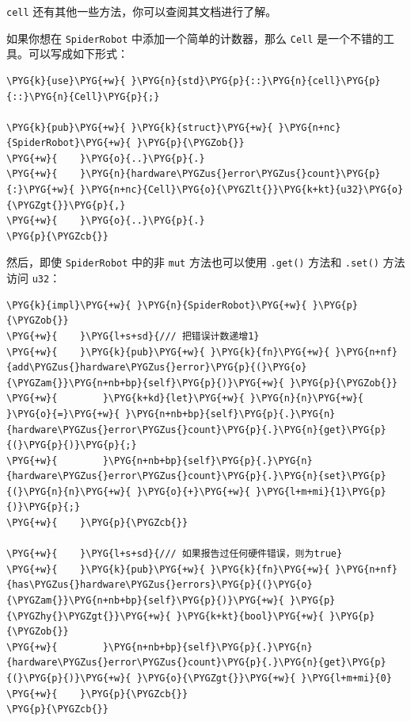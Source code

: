 \texttt{cell} 还有其他一些方法，你可以查阅其文档进行了解。

如果你想在 \texttt{SpiderRobot} 中添加一个简单的计数器，那么 \texttt{Cell} 是一个不错的工具。可以写成如下形式：

\begin{Verbatim}[commandchars=\\\{\},breaklines=true,breakanywhere=true,fontsize=\codefont,xleftmargin=17bp]
\PYG{k}{use}\PYG{+w}{ }\PYG{n}{std}\PYG{p}{::}\PYG{n}{cell}\PYG{p}{::}\PYG{n}{Cell}\PYG{p}{;}

\PYG{k}{pub}\PYG{+w}{ }\PYG{k}{struct}\PYG{+w}{ }\PYG{n+nc}{SpiderRobot}\PYG{+w}{ }\PYG{p}{\PYGZob{}}
\PYG{+w}{    }\PYG{o}{..}\PYG{p}{.}
\PYG{+w}{    }\PYG{n}{hardware\PYGZus{}error\PYGZus{}count}\PYG{p}{:}\PYG{+w}{ }\PYG{n+nc}{Cell}\PYG{o}{\PYGZlt{}}\PYG{k+kt}{u32}\PYG{o}{\PYGZgt{}}\PYG{p}{,}
\PYG{+w}{    }\PYG{o}{..}\PYG{p}{.}
\PYG{p}{\PYGZcb{}}
\end{Verbatim}

然后，即使 \texttt{SpiderRobot} 中的非 \texttt{mut} 方法也可以使用 \texttt{.get()} 方法和 \texttt{.set()} 方法访问 \texttt{u32}：

\begin{Verbatim}[commandchars=\\\{\},breaklines=true,breakanywhere=true,fontsize=\codefont,xleftmargin=17bp]
\PYG{k}{impl}\PYG{+w}{ }\PYG{n}{SpiderRobot}\PYG{+w}{ }\PYG{p}{\PYGZob{}}
\PYG{+w}{    }\PYG{l+s+sd}{/// 把错误计数递增1}
\PYG{+w}{    }\PYG{k}{pub}\PYG{+w}{ }\PYG{k}{fn}\PYG{+w}{ }\PYG{n+nf}{add\PYGZus{}hardware\PYGZus{}error}\PYG{p}{(}\PYG{o}{\PYGZam{}}\PYG{n+nb+bp}{self}\PYG{p}{)}\PYG{+w}{ }\PYG{p}{\PYGZob{}}
\PYG{+w}{        }\PYG{k+kd}{let}\PYG{+w}{ }\PYG{n}{n}\PYG{+w}{ }\PYG{o}{=}\PYG{+w}{ }\PYG{n+nb+bp}{self}\PYG{p}{.}\PYG{n}{hardware\PYGZus{}error\PYGZus{}count}\PYG{p}{.}\PYG{n}{get}\PYG{p}{(}\PYG{p}{)}\PYG{p}{;}
\PYG{+w}{        }\PYG{n+nb+bp}{self}\PYG{p}{.}\PYG{n}{hardware\PYGZus{}error\PYGZus{}count}\PYG{p}{.}\PYG{n}{set}\PYG{p}{(}\PYG{n}{n}\PYG{+w}{ }\PYG{o}{+}\PYG{+w}{ }\PYG{l+m+mi}{1}\PYG{p}{)}\PYG{p}{;}
\PYG{+w}{    }\PYG{p}{\PYGZcb{}}

\PYG{+w}{    }\PYG{l+s+sd}{/// 如果报告过任何硬件错误，则为true}
\PYG{+w}{    }\PYG{k}{pub}\PYG{+w}{ }\PYG{k}{fn}\PYG{+w}{ }\PYG{n+nf}{has\PYGZus{}hardware\PYGZus{}errors}\PYG{p}{(}\PYG{o}{\PYGZam{}}\PYG{n+nb+bp}{self}\PYG{p}{)}\PYG{+w}{ }\PYG{p}{\PYGZhy{}\PYGZgt{}}\PYG{+w}{ }\PYG{k+kt}{bool}\PYG{+w}{ }\PYG{p}{\PYGZob{}}
\PYG{+w}{        }\PYG{n+nb+bp}{self}\PYG{p}{.}\PYG{n}{hardware\PYGZus{}error\PYGZus{}count}\PYG{p}{.}\PYG{n}{get}\PYG{p}{(}\PYG{p}{)}\PYG{+w}{ }\PYG{o}{\PYGZgt{}}\PYG{+w}{ }\PYG{l+m+mi}{0}
\PYG{+w}{    }\PYG{p}{\PYGZcb{}}
\PYG{p}{\PYGZcb{}}
\end{Verbatim}

